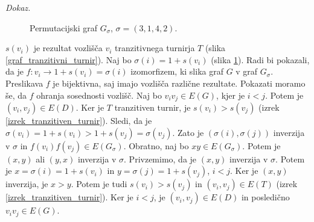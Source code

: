 \documentclass[a4paper, 12pt]{book}
\newenvironment{dokaz}{\emph{Dokaz.}\ }{\hspace{\fill}{$\Box$}}
\begin{document}
\begin{dokaz}
\begin{figure}[h]
\begin{center}
\begin{tikzpicture}[shorten >=1pt,-]
                    
            \end{tikzpicture}
        \end{center}
        \caption{Permutacijski graf $G_\sigma$, $\sigma = (3, 1, 4, 2)$.}
        \label{graf_permutacije3142}
    \end{figure}
    $s(v_i)$ je rezultat vozlišča $v_i$ tranzitivnega turnirja $T$ (slika \ref{graf_tranzitivni_turnir}).
    Naj bo $\sigma(i) = 1 + s(v_i)$ (slika \ref{graf_permutacije3142}). Radi bi pokazali, da je $f: v_i \rightarrow 1 + s(v_i) = \sigma(i)$ izomorfizem, ki slika graf $G$ v graf $G_{\sigma}$. Preslikava $f$ je bijektivna, saj imajo vozlišča različne rezultate. Pokazati moramo še, da $f$ ohranja sosednosti vozlišč. Naj bo $v_iv_j \in E(G)$, kjer je $i < j$. Potem je $(v_i, v_j) \in E(D)$. Ker je $T$ tranzitiven turnir, je $s(v_i) > s(v_j)$ (izrek \ref{izrek_tranzitiven_turnir}). Sledi, da je $\sigma(v_i) = 1 + s(v_i) > 1 + s(v_j) = \sigma(v_j)$. Zato je $(\sigma(i), \sigma(j))$ inverzija v $\sigma$ in $f(v_i)f(v_j) \in E(G_{\sigma})$. Obratno, naj bo $xy \in E(G_{\sigma})$. Potem je $(x, y)$ ali $(y, x)$ inverzija v $\sigma$. Privzemimo, da je $(x, y)$ inverzija v $\sigma$. Potem je $x = \sigma(i) = 1 + s(v_i)$ in $y = \sigma(j) = 1 + s(v_j)$, $i < j$. Ker je $(x, y)$ inverzija, je $x > y$. Potem je tudi $s(v_i) > s(v_j)$ in $(v_i, v_j) \in E(T)$ (izrek \ref{izrek_tranzitiven_turnir}). Ker je $i < j$, je $(v_i, v_j) \in E(D)$ in posledično $v_iv_j \in E(G)$.
\end{dokaz}
\end{document}
